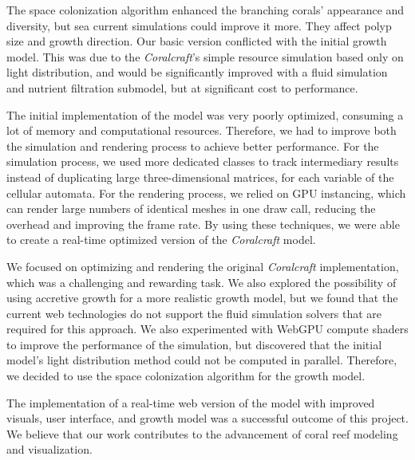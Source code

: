 \documentclass[9pt]{pnas-new}
\begin{document}
The space colonization algorithm enhanced the branching corals’ appearance and diversity, but sea current simulations could improve it more. They affect polyp size and growth direction. Our basic version conflicted with the initial growth model. This was due to the \textit{Coralcraft}’s simple resource simulation based only on light distribution, and would be significantly improved with a fluid simulation and nutrient filtration submodel, but at significant cost to performance.

The initial implementation of the model was very poorly optimized, consuming a lot of memory and computational resources. Therefore, we had to improve both the simulation and rendering process to achieve better performance. For the simulation process, we used more dedicated classes to track intermediary results instead of duplicating large three-dimensional matrices, for each variable of the cellular automata. For the rendering process, we relied on GPU instancing, which can render large numbers of identical meshes in one draw call, reducing the overhead and improving the frame rate. By using these techniques, we were able to create a real-time optimized version of the \textit{Coralcraft} model.

We focused on optimizing and rendering the original \textit{Coralcraft} implementation, which was a challenging and rewarding task. We also explored the possibility of using accretive growth for a more realistic growth model, but we found that the current web technologies do not support the fluid simulation solvers that are required for this approach. We also experimented with WebGPU compute shaders to improve the performance of the simulation, but discovered that the initial model’s light distribution method could not be computed in parallel. Therefore, we decided to use the space colonization algorithm for the growth model.

The implementation of a real-time web version of the model with improved visuals, user interface, and growth model was a successful outcome of this project. We believe that our work contributes to the advancement of coral reef modeling and visualization.


\begin{multicols}{2}
\section*{\bibname}

\end{multicols}
\end{document}

